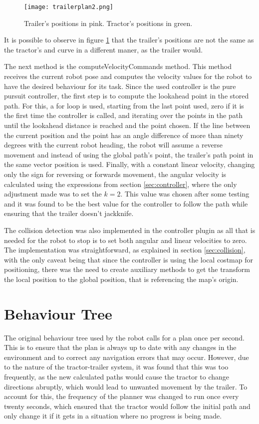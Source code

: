 \begin{figure}[h]
    \centering
    \texttt{[image: trailerplan2.png]}
    \caption{Trailer's positions in pink. Tractor's positions in green.}
    \label{fig:trailerplan}
\end{figure}

It is possible to observe in figure \ref{fig:trailerplan} that the trailer's 
positions are not the same as the tractor's and curve in a different maner, as the trailer 
would.

The next method is the computeVelocityCommands method. This method receives the current 
robot pose and computes the velocity values for the robot to have the desired behaviour 
for its task. Since the used controller is the pure pursuit controller, the first step is 
to compute the lookahead point in the stored path. For this, a for loop is used, starting 
from the last point used, zero if it is the first time the controller is called, and iterating 
over the points in the path until the lookahead distance is reached and the point chosen. 
If the line between the current position and the point has an angle difference of more than 
ninety degrees with the current robot heading, the robot will assume a reverse movement and 
instead of using the global path's point, the trailer's path point in the same vector position 
is used. Finally, with a constant linear velocity, changing only the sign for reversing or 
forwards movement, the angular velocity is calculated using the expressions from section 
\ref{sec:controller}, where the only adjustment made was to set the $k=2$. This value 
was chosen after some testing and it was found to be the best value for the 
controller to follow the path while ensuring that the trailer doesn't jackknife.

The collision detection was also implemented in the controller plugin as all that is 
needed for the robot to stop is to set both angular and linear velocities to zero. The 
implementation was straightforward, as explained in section \ref{sec:collision}, with the 
only caveat being that since the controller is using the local costmap for positioning, 
there was the need to create auxiliary methods to get the transform the local position to 
the global position, that is referencing the map's origin.

\section{Behaviour Tree}
\label{sec:behaviour_tree}

The original behaviour tree used by the robot calls for a plan once per second. This is 
to ensure that the plan is always up to date with any changes in the environment and to 
correct any navigation errors that may occur. However, due to the nature of the tractor-trailer system, 
it was found that this was too frequently, as the new calculated paths would 
cause the tractor to change directions abruptly, which would lead to unwanted movement by the trailer. 
To account for this, the frequency of the planner was changed to run once every twenty seconds, 
which ensured that the tractor would follow the initial path and only change it if 
it gets in a situation where no progress is being made.